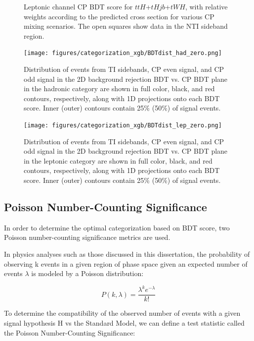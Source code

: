 \begin{figure}[htbp]
  \centering
  \caption{Leptonic channel CP BDT score for $ttH$+$tHjb$+$tWH$, with relative weights according to the predicted cross section for various CP mixing scenarios.  The open squares show data in the NTI sideband region. }
  \label{fig:cplep}
\end{figure}

\begin{figure}[htbp]
 \centering
  	\texttt{[image: figures/categorization\_xgb/BDTdist\_had\_zero.png]}
  \caption{Distribution of events from TI sidebands, CP even signal, and CP odd signal in the 2D background rejection BDT vs. CP BDT plane in the hadronic category are shown in full color, black, and red contours, respectively, along with 1D projections onto each BDT score. Inner (outer) contours contain 25\% (50\%) of signal events.}
  \label{fig:2dbdthad}
\end{figure}

\begin{figure}[htbp]
 \centering
  	\texttt{[image: figures/categorization\_xgb/BDTdist\_lep\_zero.png]}
  \caption{Distribution of events from TI sidebands, CP even signal, and CP odd signal in the 2D background rejection BDT vs. CP BDT plane  in the leptonic category are shown in full color, black, and red contours, respectively, along with 1D projections onto each BDT score. Inner (outer) contours contain 25\% (50\%) of signal events.}
  \label{fig:2dbdtlep}
\end{figure}


\subsection{Poisson Number-Counting Significance}
In order to determine the optimal categorization based on BDT score, two Poisson number-counting significance metrics are used.

In physics analyses such as those discussed in this dissertation, the probability of observing k events in a given region of phase space given an expected number of events $\lambda$ is modeled by a Poisson distribution:

\begin{equation}
P(k, \lambda) = \frac{\lambda^{k}e^{-\lambda}}{k!}
\end{equation}

To determine the compatibility of the observed number of events with a given signal hypothesis H vs the Standard Model, we can define a test statistic called the Poisson Number-Counting Significance:

